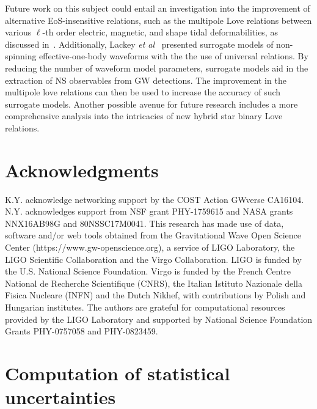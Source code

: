 \documentclass[prd,twocolumn,nofootinbib,superscriptaddress,amsmath,amssymb]{revtex4-1}
\begin{document}
Future work on this subject could entail an investigation into the improvement of alternative EoS-insensitive relations, such as the multipole Love relations between various $\ell$-th order electric, magnetic, and shape tidal deformabilities, as discussed in~\cite{Yagi:Multipole}. Additionally, Lackey \emph{et al}~\cite{Lackey:Surrogate, Lackey:EOB} presented surrogate models of non-spinning effective-one-body waveforms with the the use of universal relations. By reducing the number of waveform model parameters, surrogate models aid in the extraction of NS observables from GW detections. The improvement in the multipole love relations can then be used to increase the accuracy of such surrogate models. Another possible avenue for future research includes a more comprehensive analysis into the intricacies of new hybrid star binary Love relations.


\section*{Acknowledgments}\label{acknowledgments}
K.Y. acknowledge networking support by the COST Action GWverse CA16104.
N.Y. acknowledges support from  NSF grant PHY-1759615 and NASA grants NNX16AB98G and 80NSSC17M0041.
%
This research has made use of data, software and/or web tools obtained from the Gravitational Wave Open Science Center (https://www.gw-openscience.org), a service of LIGO Laboratory, the LIGO Scientific Collaboration and the Virgo Collaboration. LIGO is funded by the U.S. National Science Foundation. Virgo is funded by the French Centre National de Recherche Scientifique (CNRS), the Italian Istituto Nazionale della Fisica Nucleare (INFN) and the Dutch Nikhef, with contributions by Polish and Hungarian institutes.
%
The authors are grateful for computational resources provided by the LIGO Laboratory and supported by National Science Foundation Grants PHY-0757058 and PHY-0823459.  


\appendix

\section{Computation of statistical uncertainties}\label{app:stackingProcedure}
\end{document}

